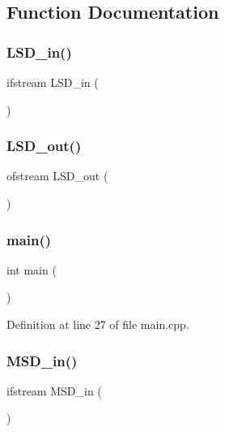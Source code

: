 \subsection{Function Documentation}
\mbox{\label{main_8cpp_a9b57553e1b7ae9e793d6ceb85cfb5d93}} 
\subsubsection{L\+S\+D\+\_\+in()}
{\footnotesize\ttfamily ifstream L\+S\+D\+\_\+in (\begin{DoxyParamCaption}\item[{\char`\"{}L\+SD input.\+in\char`\"{}}]{ }\end{DoxyParamCaption})}

\mbox{\label{main_8cpp_a49e901450ac14ff5ac764d4835d0d4e2}} 
\subsubsection{L\+S\+D\+\_\+out()}
{\footnotesize\ttfamily ofstream L\+S\+D\+\_\+out (\begin{DoxyParamCaption}\item[{\char`\"{}L\+SD output.\+out\char`\"{}}]{ }\end{DoxyParamCaption})}

\mbox{\label{main_8cpp_ae66f6b31b5ad750f1fe042a706a4e3d4}} 
\subsubsection{main()}
{\footnotesize\ttfamily int main (\begin{DoxyParamCaption}{ }\end{DoxyParamCaption})}



Definition at line 27 of file main.\+cpp.

\mbox{\label{main_8cpp_a837f101ded37d0f9de1fd51390d7f497}} 
\subsubsection{M\+S\+D\+\_\+in()}
{\footnotesize\ttfamily ifstream M\+S\+D\+\_\+in (\begin{DoxyParamCaption}\item[{\char`\"{}M\+SD input.\+in\char`\"{}}]{ }\end{DoxyParamCaption})}

